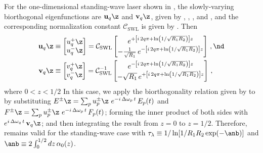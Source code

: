 For the one-dimensional standing-wave laser shown in , the slowly-varying biorthogonal eigenfunctions are $\mathbf{u}_q\z$ and $\mathbf{v}_q\z$, given by , , , and , and the corresponding normalization constant $\mathcal{C}_\mathrm{SWL}$ is given by . Then
\begin{subequations} \label{eqn:sml_1d_uvq_swl}
  \begin{align}
    \label{eqn:sml_1d_uq_swl}
    \mathbf{u}_q\z &\equiv \begin{bmatrix} u^{+}_q\z \\ u^{-}_q\z \end{bmatrix} = \mathcal{C}_\mathrm{SWL} \begin{bmatrix} e^{+\left[ i\, 2 q \pi + \ln\left(1/\sqrt{R_1 R_2}\right) \right] z} \\ -\frac{1}{\sqrt{R_1}}\, e^{-\left[ i\, 2 q \pi + \ln\left(1/\sqrt{R_1 R_2}\right) \right] z} \end{bmatrix}\, , \nd \\
    \label{eqn:sml_1d_vq_swl}
    \mathbf{v}_q\z &\equiv \begin{bmatrix} v^{+}_q\z \\ v^{-}_q\z \end{bmatrix} = \mathcal{C}^{-1}_\mathrm{SWL} \begin{bmatrix} e^{-\left[ i\, 2 q \pi + \ln\left(1/\sqrt{R_1 R_2}\right) \right] z} \\ -\sqrt{R_1}\, e^{+\left[ i\, 2 q \pi + \ln\left(1/\sqrt{R_1 R_2}\right) \right] z} \end{bmatrix}\, ,
  \end{align}
\end{subequations}
where $0 < z < 1/2$ In this case, we apply the biorthogonality relation given by  to  by substituting $E^{\pm}\z = \sum_p u^{\pm}_p\z\, \, e^{-i\, \Delta \omega_p\, t}\, E_p(t)$ and $F^{\pm}\z = \sum_p u^{\pm}_p\z\, \, e^{-i\, \Delta \omega_p\, t}\, F_p(t)$; forming the inner product of both sides with $e^{i\, \Delta \omega_q\, t}\, \mathbf{v}_q\z$; and then integrating the result from $z = 0$ to $z = 1/2$. Therefore,  remains valid for the standing-wave case with $\tau_\lambda \equiv 1 / \ln[1 / R_1 R_2 \exp(-\anb)]$ and $\anb \equiv 2 \int_0^{1/2} dz\, \alpha_0(z)$.

